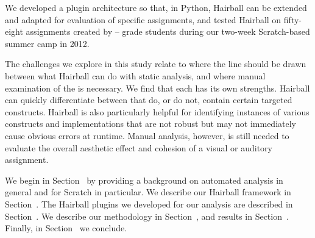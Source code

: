 We developed a plugin architecture so that, in Python, Hairball can be extended
and adapted for evaluation of specific assignments, and tested Hairball on
fifty-eight assignments created by -- grade students during our
two-week Scratch-based summer camp in 2012.

The challenges we explore in this study relate to where the line should be
drawn between what Hairball can do with static analysis, and where manual
examination of the \sprogram{} is necessary.  We find that each has its own
strengths.  Hairball can quickly differentiate between  that do, or
do not, contain certain targeted constructs. Hairball is also particularly
helpful for identifying instances of various constructs and implementations
that are not robust but may not immediately cause obvious errors at runtime.
Manual analysis, however, is still needed to evaluate the overall aesthetic
effect and cohesion of a visual or auditory assignment.

We begin in Section~ by providing a background on
automated analysis in general and for Scratch in particular. We describe our
Hairball framework in Section~. The Hairball plugins we
developed for our analysis are described in Section~. We
describe our methodology in Section~, and results in
Section~. Finally, in Section~ we
conclude.
